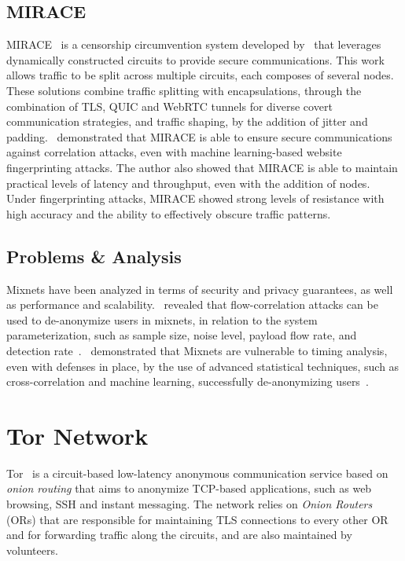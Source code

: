 \subsection{MIRACE}\label{subsec:mirace}
MIRACE~\cite{MIRACE} is a censorship circumvention system developed by~\citeauthor{MIRACE} that leverages dynamically constructed circuits to provide secure communications. This work allows traffic to be split across multiple circuits, each composes of several nodes. These solutions combine traffic splitting with encapsulations, through the combination of TLS, QUIC and WebRTC tunnels for diverse covert communication strategies, and traffic shaping, by the addition of jitter and padding.~\citeauthor{MIRACE} demonstrated that MIRACE is able to ensure secure communications against correlation attacks, even with machine learning-based website fingerprinting attacks. The author also showed that MIRACE is able to maintain practical levels of latency and throughput, even with the addition of nodes. Under fingerprinting attacks, MIRACE showed strong levels of resistance with high accuracy and the ability to effectively obscure traffic patterns. 
 
\subsection{Problems \& Analysis}\label{sec:problems_analysis}
Mixnets have been analyzed in terms of security and privacy guarantees, as well as performance and scalability.~\citeauthor{AnalysisMixNetsYeZhu} revealed that flow-correlation attacks can be used to de-anonymize users in mixnets, in relation to the system parameterization, such as sample size, noise  level, payload flow rate, and detection rate~\cite{AnalysisMixNetsYeZhu}.~\citeauthor{TrafficAnalysisLowMixnet} demonstrated that Mixnets are vulnerable to timing analysis, even with defenses in place, by the use of advanced statistical techniques, such as cross-correlation and machine learning, successfully de-anonymizing users~\cite{TrafficAnalysisLowMixnet}.

\section{Tor Network}\label{sec:tor_network}
Tor~\cite{dingledine2004tor} is a circuit-based low-latency anonymous communication service based on \textit{onion routing} that aims to anonymize TCP-based applications, such as web browsing, SSH and instant messaging. The network relies on \textit{Onion Routers} (ORs) that are responsible for maintaining TLS connections to every other OR and for forwarding traffic along the circuits, and are also maintained by volunteers.

